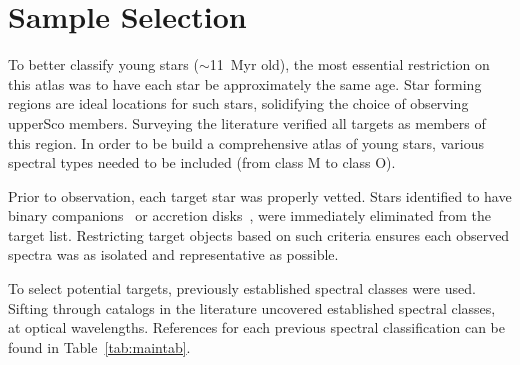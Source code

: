 \section{Sample Selection}


To better classify young stars ($\sim$11~Myr old), 
the most essential restriction on this atlas was to 
have each star be approximately the same age. 
Star forming regions are ideal locations for such stars, 
solidifying the choice of observing upperSco members.  
Surveying the literature verified all targets as members of this 
region.  In order to be build a comprehensive atlas of young 
stars, various spectral types needed to be included 
(from class M to class O).




Prior to observation, each target star was properly vetted. 
Stars identified to have binary companions~\cite{binary_guy} or accretion 
disks~\cite{binary_guy}, were immediately eliminated from the target list.  
Restricting target objects based on such criteria ensures each observed 
spectra was as isolated and representative as possible.



To select potential targets, previously established spectral classes 
were used.  
Sifting through catalogs in the literature uncovered established 
spectral classes, at optical wavelengths.    
References for each previous spectral classification 
can be found in Table~\ref{tab:maintab}.\\












